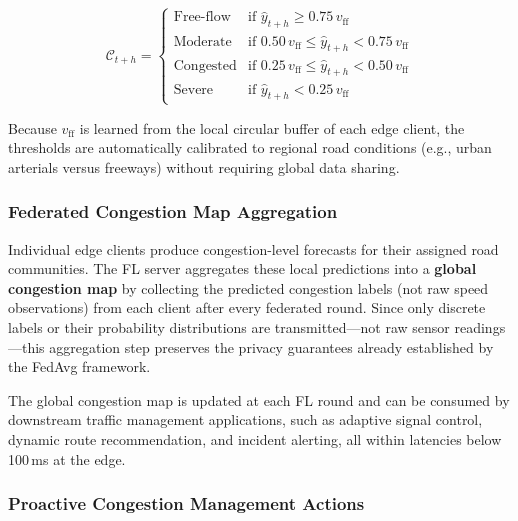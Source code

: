 \documentclass[pdflatex,sn-mathphys-num]{sn-jnl}
\theoremstyle{thmstyleone}
\theoremstyle{thmstyletwo}
\theoremstyle{thmstylethree}
\begin{document}
\begin{equation}
    \mathcal{C}_{t+h} =
    \begin{cases}
        \text{Free-flow}  & \text{if } \hat{y}_{t+h} \geq 0.75\, v_{\mathrm{ff}} \\
        \text{Moderate}   & \text{if } 0.50\, v_{\mathrm{ff}} \leq \hat{y}_{t+h} < 0.75\, v_{\mathrm{ff}} \\
        \text{Congested}  & \text{if } 0.25\, v_{\mathrm{ff}} \leq \hat{y}_{t+h} < 0.50\, v_{\mathrm{ff}} \\
        \text{Severe}     & \text{if } \hat{y}_{t+h} < 0.25\, v_{\mathrm{ff}}
    \end{cases}
    \label{eq:congestion_class}
\end{equation}

Because $v_{\mathrm{ff}}$ is learned from the local circular buffer of each edge
client, the thresholds are automatically calibrated to regional road conditions
(e.g., urban arterials versus freeways) without requiring global data sharing.

\subsubsection{Federated Congestion Map Aggregation}

Individual edge clients produce congestion-level forecasts for their assigned
road communities. The FL server aggregates these local predictions into a
\textbf{global congestion map} by collecting the predicted congestion labels
(not raw speed observations) from each client after every federated round. Since
only discrete labels or their probability distributions are transmitted---not raw
sensor readings---this aggregation step preserves the privacy guarantees already
established by the FedAvg framework.

The global congestion map is updated at each FL round and can be consumed by
downstream traffic management applications, such as adaptive signal control,
dynamic route recommendation, and incident alerting, all within latencies below
100\,ms at the edge.

\subsubsection{Proactive Congestion Management Actions}
\end{document}
